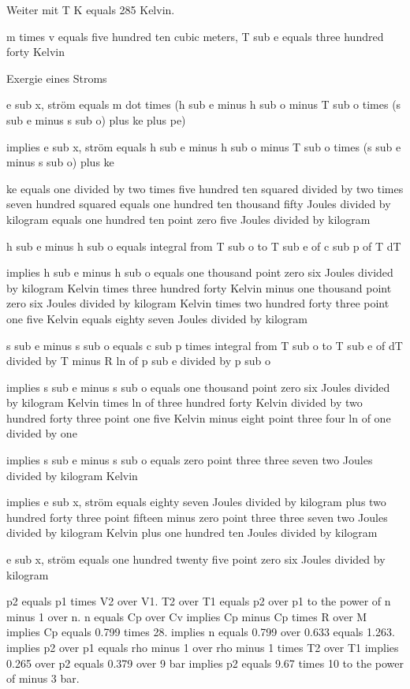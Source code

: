 Weiter mit T K equals 285 Kelvin.

m times v equals five hundred ten cubic meters, T sub e equals three hundred forty Kelvin

Exergie eines Stroms

e sub x, ström equals m dot times (h sub e minus h sub o minus T sub o times (s sub e minus s sub o) plus ke plus pe)

implies e sub x, ström equals h sub e minus h sub o minus T sub o times (s sub e minus s sub o) plus ke

ke equals one divided by two times five hundred ten squared divided by two times seven hundred squared equals one hundred ten thousand fifty Joules divided by kilogram equals one hundred ten point zero five Joules divided by kilogram

h sub e minus h sub o equals integral from T sub o to T sub e of c sub p of T dT

implies h sub e minus h sub o equals one thousand point zero six Joules divided by kilogram Kelvin times three hundred forty Kelvin minus one thousand point zero six Joules divided by kilogram Kelvin times two hundred forty three point one five Kelvin equals eighty seven Joules divided by kilogram

s sub e minus s sub o equals c sub p times integral from T sub o to T sub e of dT divided by T minus R ln of p sub e divided by p sub o

implies s sub e minus s sub o equals one thousand point zero six Joules divided by kilogram Kelvin times ln of three hundred forty Kelvin divided by two hundred forty three point one five Kelvin minus eight point three four ln of one divided by one

implies s sub e minus s sub o equals zero point three three seven two Joules divided by kilogram Kelvin

implies e sub x, ström equals eighty seven Joules divided by kilogram plus two hundred forty three point fifteen minus zero point three three seven two Joules divided by kilogram Kelvin plus one hundred ten Joules divided by kilogram

e sub x, ström equals one hundred twenty five point zero six Joules divided by kilogram

p2 equals p1 times V2 over V1.  
T2 over T1 equals p2 over p1 to the power of n minus 1 over n.  
n equals Cp over Cv implies Cp minus Cp times R over M implies Cp equals 0.799 times 28.  
implies n equals 0.799 over 0.633 equals 1.263.  
implies p2 over p1 equals rho minus 1 over rho minus 1 times T2 over T1 implies 0.265 over p2 equals 0.379 over 9 bar implies p2 equals 9.67 times 10 to the power of minus 3 bar.